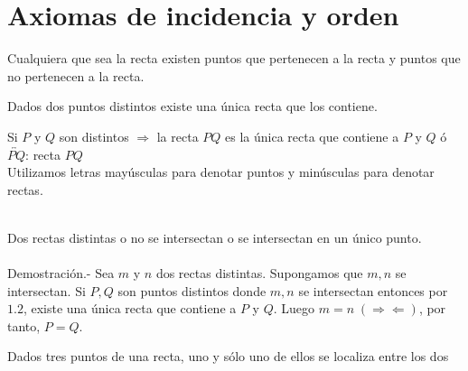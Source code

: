 \chapter{Axiomas de incidencia y orden}

    \begin{tcolorbox}[colframe=white]
	\begin{axioma}
	   Cualquiera que sea la recta existen puntos que pertenecen a la recta y puntos que no pertenecen a la recta.
	\end{axioma}
    \end{tcolorbox}

    \begin{tcolorbox}[colframe=white]
	\begin{axioma}
	    Dados dos puntos distintos existe una única recta que los contiene.
	\end{axioma}
    \end{tcolorbox}

    \begin{notacion}
	Si $P$ y $Q$ son distintos $\Rightarrow$ la recta $PQ$ es la única recta que contiene a $P$ y $Q$ ó $\overleftrightarrow{PQ}$: recta $PQ$\\
	Utilizamos letras mayúsculas para denotar puntos y minúsculas para denotar rectas.\\\\
    \end{notacion}

    \begin{proposicion}
	Dos rectas distintas o no se intersectan o se intersectan en un único punto.\\\\
	Demostración.-\; Sea $m$ y $n$ dos rectas distintas. Supongamos que $m,n$ se intersectan. Si $P, Q$ son puntos distintos donde $m,n$ se intersectan entonces por $1.2$, existe una única recta que contiene a $P$ y $Q$. Luego $m=n \; (\Rightarrow \Leftarrow)$, por tanto, $P=Q$. 
    \end{proposicion}
    
    \begin{axioma}
	Dados tres puntos de una recta, uno y sólo uno de ellos se localiza entre los dos
    \end{axioma}
